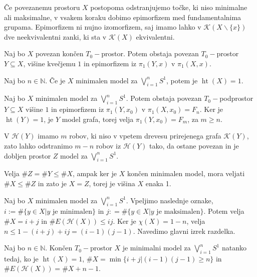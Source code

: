 \documentclass[mat1]{fmfdelo}
\DeclareRobustCommand{\h}{
    \mathcal{H}}
\DeclareMathOperator*{\htt}{ht}
\newcommand{\N}{\mathbb N}
\begin{document}
Če povezanemu prostoru $X$ postopoma odstranjujemo točke, ki niso minimalne ali maksimalne, v vsakem koraku dobimo epimorfizem med fundamentalnima grupama. Epimorfizem ni nujno izomorfizem, saj imamo lahko v $\mathcal{K}(X\backslash\{x\})$ dve neekvivalentni zanki, ki sta v $\mathcal{K}(X)$ ekvivalentni.



\begin{posledica}
    Naj bo $X$ povezan končen $T_0-$prostor. Potem obstaja povezan $T_0-$prostor $Y\subseteq X$, višine kvečjemu $1$ in epimorfizem iz $\pi_1(Y,x)$ v $\pi_1(X,x)$.
\end{posledica}

\begin{trditev}
    Naj bo $n\in\N$. Če je $X$ minimalen model za 
    $\bigvee\limits_{i=1}^{n}S^1$, potem je $\htt(X)=1$.
\end{trditev}

\begin{dokaz}
    Naj bo $X$ minimalen model za $\bigvee\limits_{i=1}^{n}S^1$. Potem obstaja povezan $T_0-$podprostor $Y\subseteq X$ višine $1$ in epimorfizem iz $\pi_1(Y,x_0)$ v $\pi_1(X,x_0)=F_n$.
Ker je $\htt(Y)=1$, je $Y$ model grafa, torej velja $\pi_1(Y,x_0)=F_m$, za $m\geq n$.

    V $\h(Y)$ imamo $m$ robov, ki niso v vpetem drevesu prirejenega grafa $\mathcal{K}(Y)$, zato lahko odstranimo $m-n$ robov iz $\h(Y)$ tako, da ostane povezan in je dobljen prostor $Z$ model za $\bigvee\limits_{i=1}^{n}S^1$.

    Velja $\#Z=\#Y\leq \#X$, ampak ker je $X$ končen minimalen model, mora veljati $\#X\leq\#Z$ in zato je $X=Z$, torej je višina $X$ enaka 1.
\end{dokaz}

Naj bo $X$ minimalen model za $\bigvee\limits_{i=1}^{n}S^1$. Vpeljimo naslednje oznake, $i:=\#\{y\in X| y \text{ je minimalen}\}$ in $j\colon =\#\{y\in X| y \text{ je maksimalen}\}$. Potem velja $\#X=i+j$ in $\#E(\h(X))\leq ij$. Ker je $\chi(X)=1-n$, velja $n\leq 1 - (i+j) + ij=(i-1)(j-1)$. Navedimo glavni izrek razdelka.

\begin{izrek}
    Naj bo $n\in\N$. Končen $T_0-$prostor $X$ je minimalni model za  $\bigvee\limits_{i=1}^{n}S^1$ natanko tedaj, ko je $\htt(X)=1$, $\#X=\min\{i+j|(i-1)(j-1)\geq n\}$ in $\#E(\h(X))= \#X + n -1.$
\end{izrek}
\end{document}
